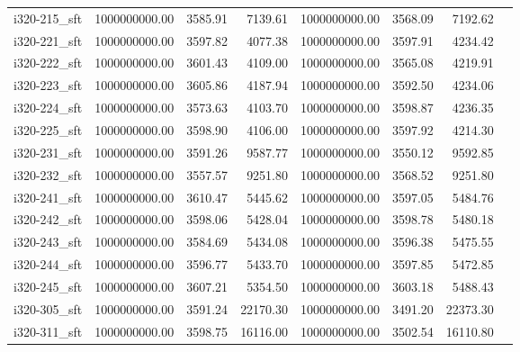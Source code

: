 \begin{tabular}{llrrrrrr}
i320-215\_sft &      1000000000.00 &                3585.91 &          7139.61 &    1000000000.00 &              3568.09 &        7192.62 \\
i320-221\_sft &      1000000000.00 &                3597.82 &          4077.38 &    1000000000.00 &              3597.91 &        4234.42 \\
i320-222\_sft &      1000000000.00 &                3601.43 &          4109.00 &    1000000000.00 &              3565.08 &        4219.91 \\
i320-223\_sft &      1000000000.00 &                3605.86 &          4187.94 &    1000000000.00 &              3592.50 &        4234.06 \\
i320-224\_sft &      1000000000.00 &                3573.63 &          4103.70 &    1000000000.00 &              3598.87 &        4236.35 \\
i320-225\_sft &      1000000000.00 &                3598.90 &          4106.00 &    1000000000.00 &              3597.92 &        4214.30 \\
i320-231\_sft &      1000000000.00 &                3591.26 &          9587.77 &    1000000000.00 &              3550.12 &        9592.85 \\
i320-232\_sft &      1000000000.00 &                3557.57 &          9251.80 &    1000000000.00 &              3568.52 &        9251.80 \\
i320-241\_sft &      1000000000.00 &                3610.47 &          5445.62 &    1000000000.00 &              3597.05 &        5484.76 \\
i320-242\_sft &      1000000000.00 &                3598.06 &          5428.04 &    1000000000.00 &              3598.78 &        5480.18 \\
i320-243\_sft &      1000000000.00 &                3584.69 &          5434.08 &    1000000000.00 &              3596.38 &        5475.55 \\
i320-244\_sft &      1000000000.00 &                3596.77 &          5433.70 &    1000000000.00 &              3597.85 &        5472.85 \\
i320-245\_sft &      1000000000.00 &                3607.21 &          5354.50 &    1000000000.00 &              3603.18 &        5488.43 \\
i320-305\_sft &      1000000000.00 &                3591.24 &         22170.30 &    1000000000.00 &              3491.20 &       22373.30 \\
i320-311\_sft &      1000000000.00 &                3598.75 &         16116.00 &    1000000000.00 &              3502.54 &       16110.80 \\

\end{tabular}
